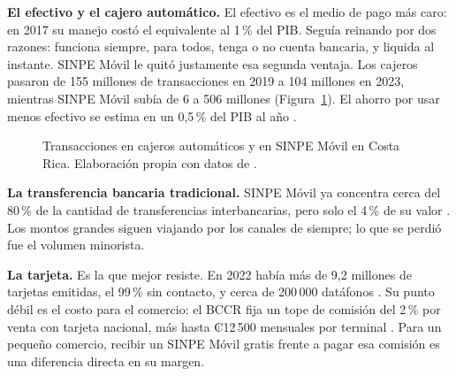 \documentclass[11pt,letterpaper]{article}
\begin{document}
\textbf{El efectivo y el cajero automático.} El efectivo es el medio de pago más
caro: en 2017 su manejo costó el equivalente al 1\,\% del PIB. Seguía reinando
por dos razones: funciona siempre, para todos, tenga o no cuenta bancaria, y
liquida al instante. SINPE Móvil le quitó justamente esa segunda ventaja. Los
cajeros pasaron de 155 millones de transacciones en 2019 a 104 millones en 2023,
mientras SINPE Móvil subía de 6 a 506 millones (Figura~\ref{fig:cajeros}). El
ahorro por usar menos efectivo se estima en un 0,5\,\% del PIB al año
\parencite{araujo2024}.

\begin{figure}[H]
\centering
{}
\caption{Transacciones en cajeros automáticos y en SINPE Móvil en Costa Rica.
Elaboración propia con datos de \Textcite{araujo2024}.}
\label{fig:cajeros}
\end{figure}

\textbf{La transferencia bancaria tradicional.} SINPE Móvil ya concentra cerca
del 80\,\% de la cantidad de transferencias interbancarias, pero solo el 4\,\%
de su valor \parencite{araujo2024}. Los montos grandes siguen viajando por los
canales de siempre; lo que se perdió fue el volumen minorista.

\textbf{La tarjeta.} Es la que mejor resiste. En 2022 había más de 9,2 millones
de tarjetas emitidas, el 99\,\% sin contacto, y cerca de 200\,000 datáfonos
\parencite{alvarado2022}. Su punto débil es el costo para el comercio: el BCCR
fija un tope de comisión del 2\,\% por venta con tarjeta nacional, más hasta
₡12\,500 mensuales por terminal \parencite{madrigal2023}. Para un pequeño
comercio, recibir un SINPE Móvil gratis frente a pagar esa comisión es una
diferencia directa en su margen.
\end{document}
